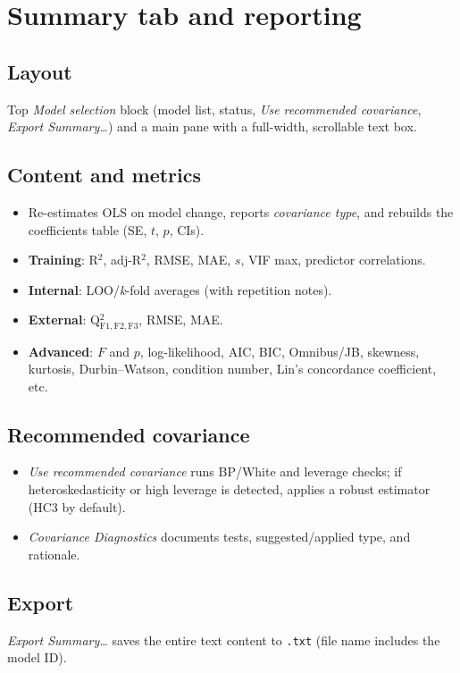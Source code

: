 \documentclass[12pt,a4paper]{article}
\begin{document}
\section{\textbf{Summary} tab and reporting}
\subsection{Layout}
Top \emph{Model selection} block (model list, status, \emph{Use recommended covariance}, \emph{Export Summary…}) and a main pane with a full-width, scrollable text box.

\subsection{Content and metrics}
\begin{itemize}
  \item Re-estimates OLS on model change, reports \emph{covariance type}, and rebuilds the coefficients table (SE, $t$, $p$, CIs).
  \item \textbf{Training}: R$^2$, adj-R$^2$, RMSE, MAE, $s$, VIF max, predictor correlations.
  \item \textbf{Internal}: LOO/\emph{k}-fold averages (with repetition notes).
  \item \textbf{External}: Q$^2_\mathrm{F1,F2,F3}$, RMSE, MAE.
  \item \textbf{Advanced}: $F$ and $p$, log-likelihood, AIC, BIC, Omnibus/JB, skewness, kurtosis, Durbin–Watson, condition number, Lin’s concordance coefficient, etc.
\end{itemize}

\subsection{Recommended covariance}
\begin{itemize}
  \item \emph{Use recommended covariance} runs BP/White and leverage checks; if heteroskedasticity or high leverage is detected, applies a robust estimator (HC3 by default).
  \item \emph{Covariance Diagnostics} documents tests, suggested/applied type, and rationale.
\end{itemize}

\subsection{Export}
\emph{Export Summary…} saves the entire text content to \texttt{.txt} (file name includes the model ID).
\end{document}
